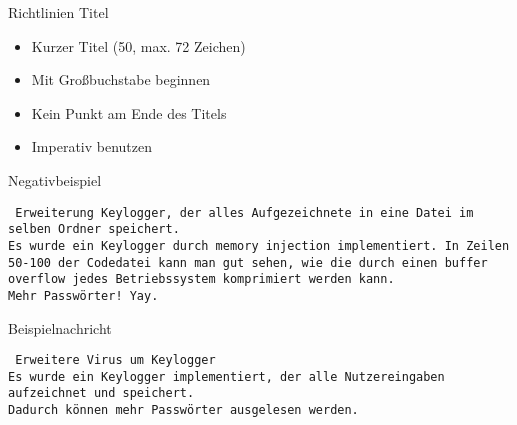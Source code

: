 \begin{frame}{Richtlinien Titel}
\begin{itemize}
\item Kurzer Titel (50, max. 72 Zeichen)
\item Mit Großbuchstabe beginnen
\item Kein Punkt am Ende des Titels
\item Imperativ benutzen
\end{itemize}
\end{frame}

\begin{frame}{Negativbeispiel}
\footnotesize

\texttt{\noindent
Erweiterung Keylogger, der alles Aufgezeichnete in eine Datei im selben Ordner speichert.\bigskip\\
Es wurde ein Keylogger durch memory injection implementiert. In Zeilen 50-100 der Codedatei kann man gut sehen, wie die durch einen buffer overflow jedes Betriebssystem komprimiert werden kann.\\
Mehr Passwörter! Yay.
}
\end{frame}

\begin{frame}{Beispielnachricht}
\footnotesize

\texttt{\noindent
Erweitere Virus um Keylogger\bigskip\\
Es wurde ein Keylogger implementiert, der alle 
Nutzereingaben aufzeichnet und speichert.\\
Dadurch können mehr Passwörter ausgelesen werden.
}
\end{frame}


